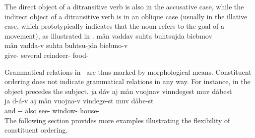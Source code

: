 The direct object of a ditransitive verb is also in the accusative case, while the indirect object %
of a ditransitive verb is in an oblique case (usually in the illative case, which prototypically indicates that the noun refers to the goal of a movement), as illustrated in .%
\ea\label{ditrans1}
\glll	mån vaddav suhta buhtsujda biebmov\\
	mån vadda-v suhta buhtsu-jda biebmo-v\\
	 give- several reindeer- food-\\\nopagebreak
{} 
\z

Grammatical relations in \PS\ are thus marked by morphological means. Constituent ordering does not indicate grammatical relations in any way. For instance, in  the object precedes the subject. %
\ea\label{monotrans2}
\glll	ja dáv aj mån vuojnav vinndegest muv dåbest\\
	ja d-á-v aj mån vuojna-v vindege-st muv dåbe-st\\
	and -- also  see- window-  house-\\\nopagebreak
{} 
\z
The following section %
provides more examples illustrating the flexibility of constituent ordering.


